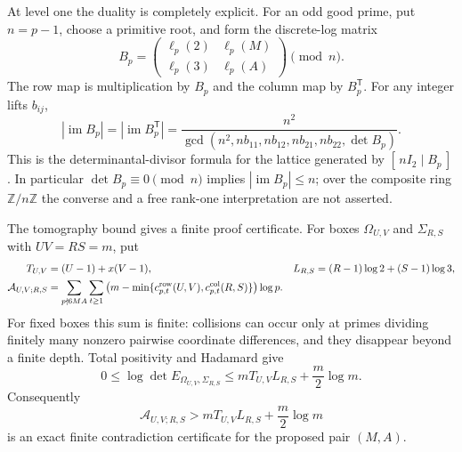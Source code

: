 \documentclass[11pt,oneside]{article}
\theoremstyle{definition}
\theoremstyle{remark}
\newcommand{\Z}{\mathbb Z}
\begin{document}
At level one the duality is completely explicit.  For an odd good prime, put $n=p-1$,
choose a primitive root, and form the discrete-log matrix
\begin{equation}
 B_p=
 \begin{pmatrix}
 \ell_p(2)&\ell_p(M)\\
 \ell_p(3)&\ell_p(A)
 \end{pmatrix}\pmod n.
 \label{wsmith:eq-discrete-log-matrix}
\end{equation}
The row map is multiplication by $B_p$ and the column map by $B_p^{\mathsf T}$.  For any
integer lifts $b_{ij}$,
\begin{equation}
 |\operatorname{im}B_p|
 =|\operatorname{im}B_p^{\mathsf T}|
 =\frac{n^2}{
 \gcd(n^2,nb_{11},nb_{12},nb_{21},nb_{22},\det B_p)}.
 \label{wsmith:eq-discrete-log-image}
\end{equation}
This is the determinantal-divisor formula for the lattice generated by
$[\,nI_2\mid B_p\,]$.  In particular $\det B_p\equiv0\pmod n$ implies
$|\operatorname{im}B_p|\le n$; over the composite ring $\Z/n\Z$ the converse and a free
rank-one interpretation are not asserted.

The tomography bound gives a finite proof certificate.  For boxes
$\Omega_{U,V}$ and $\Sigma_{R,S}$ with $UV=RS=m$, put
\begin{align}
 T_{U,V}&=(U-1)+x(V-1),&
 L_{R,S}&=(R-1)\log2+(S-1)\log3,\notag\\
 \mathcal A_{U,V;R,S}
 &=\sum_{p\nmid6MA}\sum_{t\ge1}
 \left(m-\min\{c^{\rm row}_{p,t}(U,V),
                 c^{\rm col}_{p,t}(R,S)\}\right)\log p .
 \label{wsmith:eq-orbit-energy}
\end{align}
For fixed boxes this sum is finite: collisions can occur only at primes dividing finitely
many nonzero pairwise coordinate differences, and they disappear beyond a finite depth.
Total positivity and Hadamard give
\begin{equation}
 0\le\log\det E_{\Omega_{U,V},\Sigma_{R,S}}
 \le mT_{U,V}L_{R,S}+\frac m2\log m.
 \label{wsmith:eq-tomography-hadamard}
\end{equation}
Consequently
\begin{equation}
 \mathcal A_{U,V;R,S}>
 mT_{U,V}L_{R,S}+\frac m2\log m
 \label{wsmith:eq-tomography-certificate}
\end{equation}
is an exact finite contradiction certificate for the proposed pair $(M,A)$.
\end{document}
